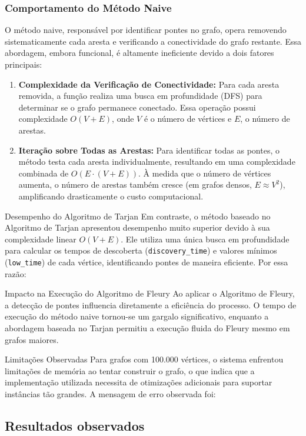 \documentclass[12pt]{article}
\begin{document}
\subsubsection{Comportamento do Método Naive}
O método naive, responsável por identificar pontes no grafo, opera removendo sistematicamente cada aresta e verificando a conectividade do grafo restante. Essa abordagem, embora funcional, é altamente ineficiente devido a dois fatores principais:
\begin{enumerate}
    \item \textbf{Complexidade da Verificação de Conectividade:} Para cada aresta removida, a função realiza uma busca em profundidade (DFS) para determinar se o grafo permanece conectado. Essa operação possui complexidade \(O(V + E)\), onde \(V\) é o número de vértices e \(E\), o número de arestas.
    \item \textbf{Iteração sobre Todas as Arestas:} Para identificar todas as pontes, o método testa cada aresta individualmente, resultando em uma complexidade combinada de \(O(E \cdot (V + E))\). À medida que o número de vértices aumenta, o número de arestas também cresce (em grafos densos, \(E \approx V^2\)), amplificando drasticamente o custo computacional.
\end{enumerate}

Desempenho do Algoritmo de Tarjan Em contraste, o método baseado no Algoritmo de Tarjan apresentou desempenho muito superior devido à sua complexidade linear \(O(V + E)\). Ele utiliza uma única busca em profundidade para calcular os tempos de descoberta (\texttt{discovery\_time}) e valores mínimos (\texttt{low\_time}) de cada vértice, identificando pontes de maneira eficiente. Por essa razão:

Impacto na Execução do Algoritmo de Fleury Ao aplicar o Algoritmo de Fleury, a detecção de pontes influencia diretamente a eficiência do processo. O tempo de execução do método naive tornou-se um gargalo significativo, enquanto a abordagem baseada no Tarjan permitiu a execução fluida do Fleury mesmo em grafos maiores.

Limitações Observadas Para grafos com 100.000 vértices, o sistema enfrentou limitações de memória ao tentar construir o grafo, o que indica que a implementação utilizada necessita de otimizações adicionais para suportar instâncias tão grandes. A mensagem de erro observada foi:

\subsection{Resultados observados}
\end{document}

